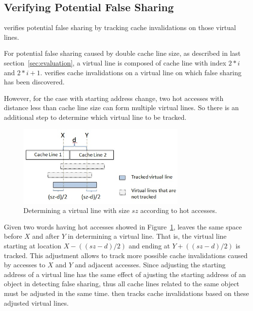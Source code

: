\subsection{Verifying Potential False Sharing}
\label{sec:tracking}

 verifies potential false sharing by tracking 
cache invalidations on those virtual lines. 

For potential false sharing caused by double cache line size, as described in
last section~\ref{sec:evaluation}, a virtual line is composed of 
cache line with index $2*i$ and $2*i+1$.  verifies cache invalidations
on a virtual line on which false sharing has been discovered.

However, for the case with starting address change, 
two hot accesses with distance less than cache line size 
can form multiple virtual lines. 
So there is an additional step to determine which virtual line to be tracked.

\begin{figure}
\begin{center} 
\includegraphics[width=3.3in]{fig/prediction-tian.jpg}
\end{center}
\caption{Determining a virtual line with size $sz$ according to hot accesses.}
\label{fig:trackpotential}
\end{figure}

Given two words having hot accesses showed in Figure~\ref{fig:trackpotential}, 
 leaves the same space before $X$ and after $Y$ in determining a virtual line. 
That is, the virtual line starting 
at location $X-((sz-d)/2)$ and ending at $Y+((sz-d)/2)$ is tracked. 
This adjustment allows to track more possible cache invalidations caused by
accesses to $X$ and $Y$ and adjacent accesses.
Since adjusting the starting address of a virtual line has the same effect of
ajusting the starting address of an object in detecting false sharing, thus
all cache lines related to the same object must be adjusted in the same time.
 then tracks cache invalidations based on these adjusted virtual lines.

